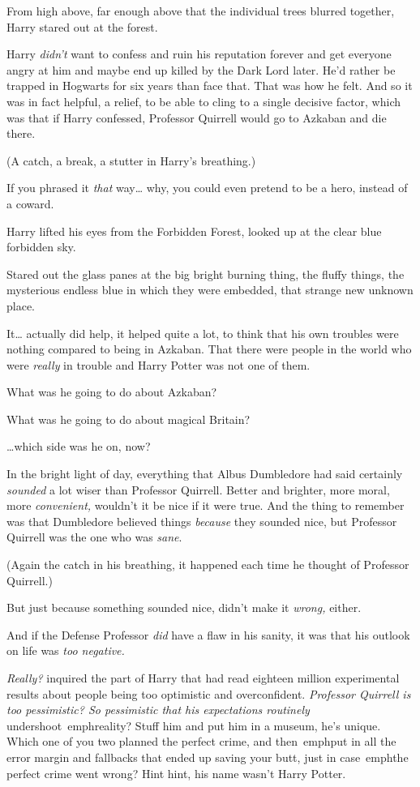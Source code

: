 From high above, far enough above that the individual trees blurred together, 
Harry stared out at the forest.

Harry \emph{didn't} want to confess and ruin his reputation forever and get 
everyone angry at him and maybe end up killed by the Dark Lord later. He'd 
rather be trapped in Hogwarts for six years than face that. That was how he 
felt. And so it was in fact helpful, a relief, to be able to cling to a single 
decisive factor, which was that if Harry confessed, Professor Quirrell would go 
to Azkaban and die there.

(A catch, a break, a stutter in Harry's breathing.)

If you phrased it \emph{that} way{\ldots} why, you could even pretend to be a 
hero, instead of a coward.

Harry lifted his eyes from the Forbidden Forest, looked up at the clear blue 
forbidden sky.

Stared out the glass panes at the big bright burning thing, the fluffy things, 
the mysterious endless blue in which they were embedded, that strange new 
unknown place.

It{\ldots} actually did help, it helped quite a lot, to think that his own 
troubles were nothing compared to being in Azkaban. That there were people in 
the world who were \emph{really} in trouble and Harry Potter was not one of 
them.

What was he going to do about Azkaban?

What was he going to do about magical Britain?

{\ldots}which side was he on, now?

In the bright light of day, everything that Albus Dumbledore had said certainly 
\emph{sounded} a lot wiser than Professor Quirrell. Better and brighter, more 
moral, more \emph{convenient,} wouldn't it be nice if it were true. And the 
thing to remember was that Dumbledore believed things \emph{because} they 
sounded nice, but Professor Quirrell was the one who was \emph{sane}.

(Again the catch in his breathing, it happened each time he thought of 
Professor Quirrell.)

But just because something sounded nice, didn't make it \emph{wrong,} either.

And if the Defense Professor \emph{did} have a flaw in his sanity, it was that 
his outlook on life was \emph{too negative.}

\emph{Really?} inquired the part of Harry that had read eighteen million 
experimental results about people being too optimistic and overconfident. 
\emph{Professor Quirrell is too pessimistic? So pessimistic that his 
expectations routinely} undershoot\ emph{reality? Stuff him and put him in a 
museum, he's unique. Which one of you two planned the perfect crime, and} 
then\ emph{put in all the error margin and fallbacks that ended up saving your 
butt,} just in case\ emph{the perfect crime went wrong? Hint hint, his name 
wasn't Harry Potter.}

